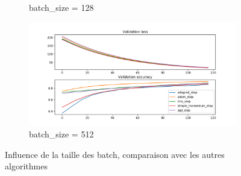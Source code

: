 \documentclass[fleqn,11pt, titlepage, french]{article}
\begin{document}
\begin{figure}[H]
\begin{subfigure}{0.45\textwidth}
			\caption{batch\_size = 128}
		\end{subfigure}
		\begin{subfigure}{0.45\textwidth}
			\centering
			\includegraphics[scale=0.25]{../gdsvm/exports/mnist-batch512-comparison.png}
			\caption{batch\_size = 512}
		\end{subfigure}
		
		\caption{Influence de la taille des batch, comparaison avec les autres algorithmes}
	\end{figure}
\end{document}
